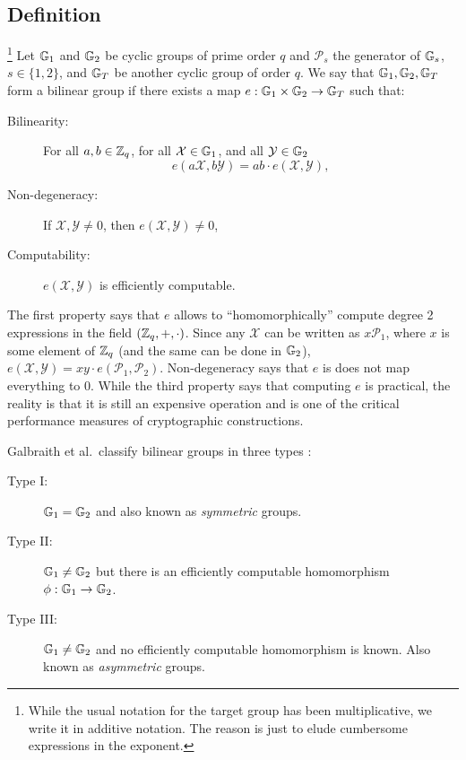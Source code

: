 \subsection{Definition}

\begin{definition} \footnote{While the usual notation for the target group has been multiplicative, we write it in additive notation. The reason is just to elude cumbersome expressions in the exponent.}
Let $\mathbb{G}_1$ and $\mathbb{G}_2$ be cyclic groups of prime order $q$ and $\mathcal{P}_s$ the generator of $\mathbb{G}_s$, $s\in\{1,2\}$, and $\mathbb{G}_T$ be another cyclic group of order $q$. We say that $\mathbb{G}_1,\mathbb{G}_2,\mathbb{G}_T$ form a bilinear group if there exists a map $e:\mathbb{G}_1\times\mathbb{G}_2\to\mathbb{G}_T$ such that:
\begin{description}
\item[Bilinearity:] For all $a,b\in\mathbb{Z}_q$, for all $\mathcal{X}\in\mathbb{G}_1$, and all $\mathcal{Y}\in\mathbb{G}_2$
$$
e(a\mathcal{X},b\mathcal{Y})=ab\cdot e(\mathcal{X},\mathcal{Y}),
$$
\item[Non-degeneracy:] If $\mathcal{X},\mathcal{Y}\neq0$, then $e(\mathcal{X},\mathcal{Y})\neq 0$,
\item[Computability:] $e(\mathcal{X},\mathcal{Y})$ is efficiently computable.
\end{description} 
\end{definition} 

The first property says that $e$ allows to ``homomorphically'' compute degree 2 expressions in the field $(\mathbb{Z}_q,+,\cdot)$. Since any $\mathcal{X}$ can be written as $x\mathcal{P}_1$, where $x$ is some element of $\mathbb{Z}_q$ (and the same can be done in $\mathbb{G}_2$), $e(\mathcal{X},\mathcal{Y})=xy\cdot e(\mathcal{P}_1,\mathcal{P}_2)$. Non-degeneracy says that $e$ is does not map everything to 0. While the third property says that computing $e$ is practical, the reality is that it is still an expensive operation and is one of the critical performance measures of cryptographic constructions.

Galbraith et al.~classify bilinear groups in three types \cite{DAM:GalPatSma08}:

\begin{description}
\item[Type I:] $\mathbb{G}_1=\mathbb{G}_2$ and also known as \emph{symmetric} groups. 
\item[Type II:] $\mathbb{G}_1\neq\mathbb{G}_2$ but there is an efficiently computable homomorphism $\phi:\mathbb{G}_1\to\mathbb{G}_2$.
\item[Type III:] $\mathbb{G}_1\neq\mathbb{G}_2$ and no efficiently computable homomorphism is known. Also known as \emph{asymmetric} groups.
\end{description}

